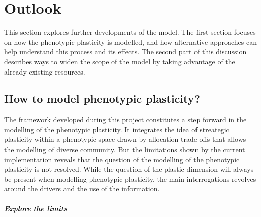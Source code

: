 

\chapter{Outlook}

This section explores further developments of the model. The first section focuses on how the phenotypic plasticity is modelled, and how alternative approaches can help understand this process and its effects. The second part of this discussion describes ways to widen the scope of the model by taking advantage of the already existing resources.

\section{How to model phenotypic plasticity? }

The framework developed during this project constitutes a step forward in the modelling of the phenotypic plasticity. It integrates the idea of streategic plasticity \parencite{bradshaw_evolutionary_1965, dewitt_expanding_2016} within a phenotypic space drawn by allocation trade-offs that allows the modelling of diverse community. But the limitations shown by the current implementation reveals that the question of the modelling of the phenotypic plasticity is not resolved. While the question of the plastic dimension will always be present when modelling phenotypic plasticity, the main interrogations revolves around the drivers and the use of the information. 


\paragraph{Explore the limits}

